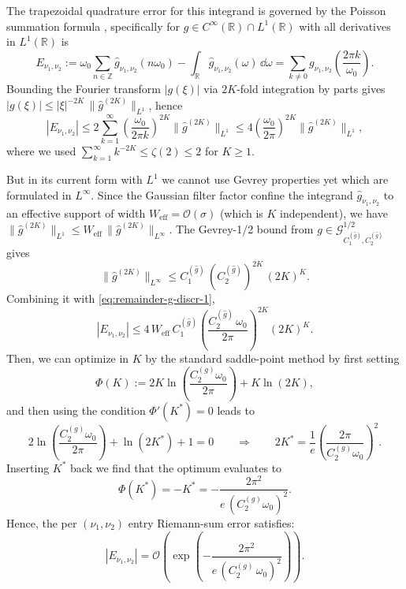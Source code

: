 \begin{enumerate}[(a)]
    The trapezoidal quadrature error for this integrand is governed by the Poisson summation formula \cite[Chapter 5]{trefethen2014exponentially}, specifically for $g \in C^\infty(\mathbb{R}) \cap L^1(\mathbb{R})$ with all derivatives in $L^1(\mathbb{R})$ is
    \begin{equation}
        E_{\nu_1,\nu_2} := \omega_0 \sum_{n \in \mathbb{Z}} \hat{g}_{\nu_1,\nu_2}(n\omega_0) - \int_{\mathbb{R}} \hat{g}_{\nu_1,\nu_2}(\omega)\,\dd\omega = \sum_{k \neq 0} g_{\nu_1,\nu_2}\!\left(\frac{2\pi k}{\omega_0}\right).
    \end{equation}
    Bounding the Fourier transform $|g(\xi)|$ via $2K$-fold integration by parts gives $|g(\xi)| \leq |\xi|^{-2K}\,\|\hat{g}^{(2K)}\|_{L^1}$, hence
    \begin{equation} \label{eq:remainder-g-discr-1}
        |E_{\nu_1,\nu_2}| \leq 2\sum_{k=1}^{\infty}\left(\frac{\omega_0}{2\pi k}\right)^{2K}\|\hat{g}^{(2K)}\|_{L^1} \leq 4\left(\frac{\omega_0}{2\pi}\right)^{2K}\|\hat{g}^{(2K)}\|_{L^1},
    \end{equation}
    where we used $\sum_{k=1}^\infty k^{-2K} \leq \zeta(2) \leq 2$ for $K \geq 1$. 

    But in its current form with $L^1$ we cannot use Gevrey properties yet which are formulated in $L^\infty$. Since the Gaussian filter factor confine the integrand $\hat{g}_{\nu_1, \nu_2}$ to an effective support of width $W_\text{eff} = \mathcal{O}(\sigma)$ (which is $K$ independent), we have $\|\hat{g}^{(2K)}\|_{L^1} \leq W_\mathrm{eff}\,\|\hat{g}^{(2K)}\|_{L^\infty}$. The Gevrey-1/2 bound from $g \in \mathcal{G}^{1/2}_{C_1^{(\hat{g})}, C_2^{(\hat{g})}}$ gives 
    $$
       \|\hat{g}^{(2K)}\|_{L^\infty} \leq C_1^{(\hat{g})}\,(C_2^{(\hat{g})})^{2K}\,(2K)^{K}. 
    $$
    Combining it with \eqref{eq:remainder-g-discr-1}, 
    \begin{equation}
        |E_{\nu_1,\nu_2}| \leq 4\,W_\mathrm{eff}\,C_1^{(\hat{g})}\left(\frac{C_2^{(\hat{g})}\,\omega_0}{2\pi}\right)^{2K}(2K)^K.
    \end{equation}
    Then, we can optimize in $K$ by the standard saddle-point method by first setting 
    $$
        \Phi(K) := 2K\ln\!\left(\frac{C_2^{(g)}\omega_0}{2\pi}\right) + K\ln(2K),
    $$
    and then using the condition $\Phi'(K^*) = 0$ leads to 
    $$
        2\ln\!\left(\frac{C_2^{(g)}\omega_0}{2\pi}\right) + \ln(2K^*) + 1 = 0 \qquad\Longrightarrow\qquad 2K^* = \frac{1}{e}\!\left(\frac{2\pi}{C_2^{(g)}\omega_0}\right)^{\!2}.
    $$
    Inserting $K^*$ back we find that the optimum evaluates to
    $$
        \Phi(K^*) = -K^* = -\frac{2\pi^2}{e\,(C_2^{(g)}\omega_0)^2}.
    $$
    Hence, the per $(\nu_1, \nu_2)$ entry Riemann-sum error satisfies:
    \begin{equation}\label{eq:per-entry-error-smooth-metro}
    |E_{\nu_1,\nu_2}| = \mathcal{O}\!\left(\exp\!\left(-\frac{2\pi^2}{e\,(C_2^{(g)}\,\omega_0)^2}\right)\right).
    \end{equation}


\end{enumerate}
